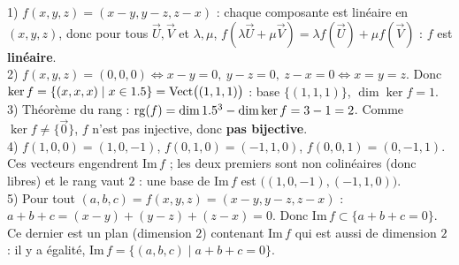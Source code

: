 1) $f(x,y,z)=(x-y,y-z,z-x)$ : chaque composante est linéaire en $(x,y,z)$, donc pour tous
$\vec U,\vec V$ et $\lambda,\mu$, $f(\lambda\vec U+\mu\vec V)=\lambda f(\vec U)+\mu f(\vec V)$ :
$f$ est \textbf{linéaire}.\\
2) $f(x,y,z)=(0,0,0)\Leftrightarrow x-y=0,\ y-z=0,\ z-x=0\Leftrightarrow x=y=z$. Donc
$\ker f=\{(x,x,x)\mid x\in1.5\}=\mathrm{Vect}\big((1,1,1)\big)$ : base $\{(1,1,1)\}$, $\dim\ker f=1$.\\
3) Théorème du rang : $\mathrm{rg}(f)=\dim1.5^3-\dim\ker f=3-1=2$. Comme $\ker f\neq\{\vec0\}$,
$f$ n'est pas injective, donc \textbf{pas bijective}.\\
4) $f(1,0,0)=(1,0,-1)$, $f(0,1,0)=(-1,1,0)$, $f(0,0,1)=(0,-1,1)$. Ces vecteurs engendrent
$\mathrm{Im}\,f$ ; les deux premiers sont non colinéaires (donc libres) et le rang vaut $2$ : une
base de $\mathrm{Im}\,f$ est $\big((1,0,-1),(-1,1,0)\big)$.\\
5) Pour tout $(a,b,c)=f(x,y,z)=(x-y,y-z,z-x)$ : $a+b+c=(x-y)+(y-z)+(z-x)=0$. Donc
$\mathrm{Im}\,f\subset\{a+b+c=0\}$. Ce dernier est un plan (dimension $2$) contenant
$\mathrm{Im}\,f$ qui est aussi de dimension $2$ : il y a égalité,
$\mathrm{Im}\,f=\{(a,b,c)\mid a+b+c=0\}$.
